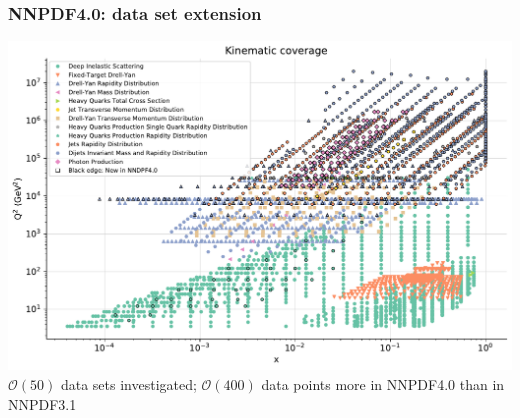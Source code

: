 \documentclass{beamer}
\begin{document}
\begin{frame}
 \frametitle{NNPDF4.0: data set extension}
 \footnotesize
 \centering
 \includegraphics[width=\textwidth]{plots/Markers0_plot_xq2}\\
 $\mathcal{O}(50)$ data sets investigated; $\mathcal{O}(400)$ data points more in NNPDF4.0 than in NNPDF3.1
\end{frame}
\end{document}
